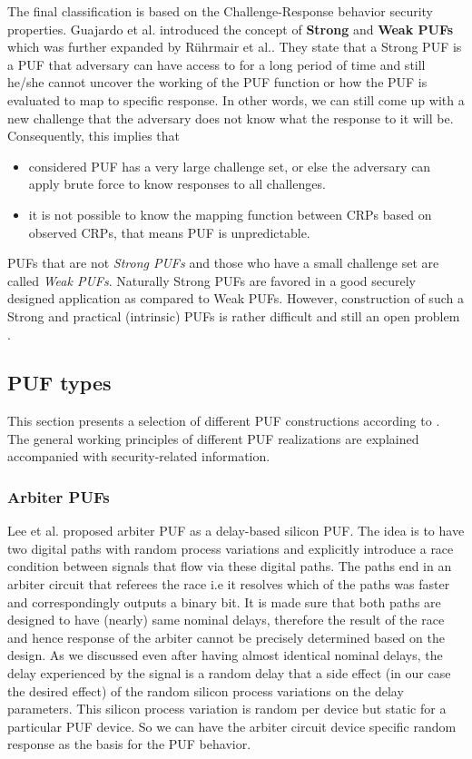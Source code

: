 The final classification is based on the Challenge-Response behavior security properties. Guajardo et al. \cite{11} introduced the concept of \textbf{Strong} and \textbf{Weak PUFs} which was further expanded by Rührmair et al.\cite{29}. They state that a Strong PUF is a PUF that adversary can have access to for a long period of time and still he/she cannot uncover the working of the PUF function or how the PUF is evaluated to map to specific response. In other words, we can still come up with a
new challenge that the adversary does not know what the response to it will be. Consequently, this implies that
\begin{itemize}
	\item considered PUF has a very large challenge set, or else the adversary can apply brute force to know responses to all challenges.
	\item it is not possible to know the mapping function between CRPs based on observed CRPs, that means PUF is unpredictable.
\end{itemize}
PUFs that are not \emph{Strong PUFs} and those who have a small challenge set are called \emph{Weak PUFs}. Naturally Strong PUFs are favored in a good securely designed application as compared to Weak PUFs. However, construction of such a Strong and practical (intrinsic) PUFs is rather difficult and still an open problem \cite{29}.\\

\subsection{PUF types}
This section presents a selection of different PUF constructions according to \cite{17}. The general working principles of different PUF realizations are explained accompanied with security-related information.

\subsubsection{Arbiter PUFs}
\label{arbiterpuf}

Lee et al.\cite{31} proposed arbiter PUF as a delay-based silicon PUF. The idea is to have two digital paths with random process variations and explicitly introduce a race condition between signals that flow via these digital paths. The paths end in an arbiter circuit that referees the race i.e it resolves which of the paths was faster and correspondingly outputs a binary bit. It is made sure that both paths are designed to have (nearly) same nominal delays, therefore the result of the race and hence
response of the arbiter cannot be precisely determined based on the design. As we discussed even after having almost identical nominal delays, the delay experienced by the signal is a random delay that a side effect (in our case the desired effect) of the random silicon process variations on the delay parameters. This silicon process variation is random per device but static for a particular PUF device. So we can have the arbiter circuit device specific random response as the basis for the PUF
behavior.\\

